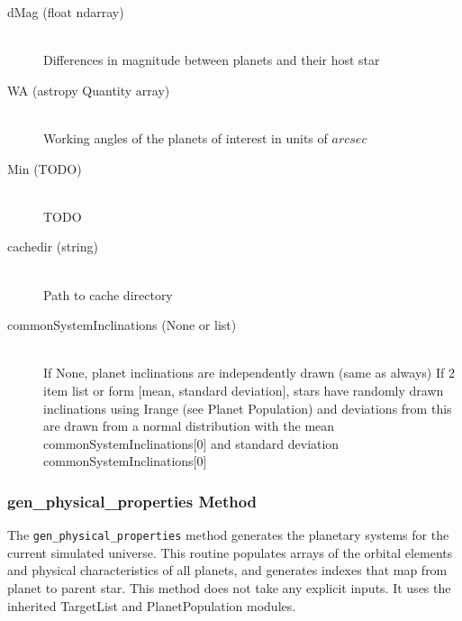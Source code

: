 \documentclass[cleanfoot]{asme2ej}
\begin{document}
\begin{itemize}
\begin{description}
    \item[dMag (float ndarray)] \hfill \\ Differences in magnitude between planets and their host star
    \item[WA (astropy Quantity array)] \hfill \\ Working angles of the planets of interest in units of $arcsec$
    \item[Min (TODO)] \hfill \\ TODO
    \item[cachedir (string)] \hfill \\ Path to cache directory
    \item[commonSystemInclinations (None or list)] \hfill \\ If None, planet inclinations are independently drawn (same as always) If 2 item list or form [mean, standard deviation], stars have randomly drawn inclinations using Irange (see Planet Population) and deviations from this are drawn from a normal distribution with the mean commonSystemInclinations[0] and standard deviation commonSystemInclinations[0]
\end{description}
\end{itemize}

\subsubsection{gen\_physical\_properties Method} \label{sec:genphysicalpropertiestask}
The \verb+gen_physical_properties+ method generates the planetary systems for the current simulated universe. This routine populates arrays of the orbital elements and physical characteristics of all planets, and generates indexes that map from planet to parent star. This method does not take any explicit inputs.  It uses the inherited TargetList and PlanetPopulation modules.
\end{document}
